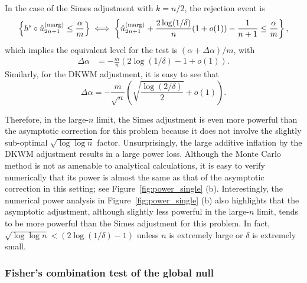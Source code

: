 \documentclass[11pt]{article}
\def\marg{\textnormal{(marg)}}
\renewcommand{\P}{\mathbb{P}}
\begin{document}
In the case of the Simes adjustment with $k=n/2$, the rejection event is
\begin{align*}
   \left\{h^{\mathrm{s}} \circ \hat{u}^\marg_{2n+1} \leq \frac{\alpha}{m}\right\}
  \iff \left\{\hat{u}^\marg_{2n+1} + \frac{2 \log(1/\delta)}{n}(1 + o(1)) - \frac{1}{n+1} \leq \frac{\alpha}{m}\right\},
\end{align*}
which implies the equivalent level for the test is $(\alpha + \Delta \alpha)/m$, with
\begin{align*}
  \Delta \alpha 
  & = - \frac{m}{n} \left(2\log(1/\delta)-1 + o(1)\right).
\end{align*}
Similarly, for the DKWM adjustment, it is easy to see that
\[\Delta \alpha = -\frac{m}{\sqrt{n}}\left(\sqrt{\frac{\log(2/\delta)}{2}} + o(1)\right).\]

Therefore, in the large-$n$ limit, the Simes adjustment is even more powerful than the asymptotic correction for this problem because it does not involve the slightly sub-optimal $\sqrt{\log \log n}$ factor. Unsurprisingly, the large additive inflation by the DKWM adjustment results in a large power loss.
Although the Monte Carlo method is not as amenable to analytical calculations, it is easy to verify numerically that its power is almost the same as that of the asymptotic correction in this setting; see Figure~\ref{fig:power_single} (b).
Interestingly, the numerical power analysis in Figure~\ref{fig:power_single} (b) also highlights that the asymptotic adjustment, although slightly less powerful in the large-$n$ limit, tends to be more powerful than the Simes adjustment for this problem. In fact, $\sqrt{\log \log n} < \left(2\log(1/\delta)-1\right)$ unless $n$ is extremely large or $\delta$ is extremely small.


\subsubsection{Fisher's combination test of the global null}
\end{document}
